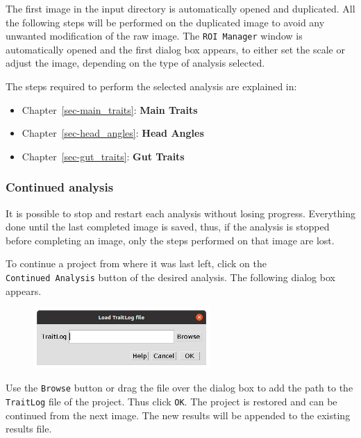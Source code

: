 \documentclass[
  letterpaper,
]{scrbook}
\providecommand{\tightlist}{%
  \setlength{\itemsep}{0pt}\setlength{\parskip}{0pt}}\usepackage{longtable,booktabs,array}
\begin{document}
The first image in the input directory is automatically opened and
duplicated. All the following steps will be performed on the duplicated
image to avoid any unwanted modification of the raw image. The
\texttt{ROI\ Manager} window is automatically opened and the first
dialog box appears, to either set the scale or adjust the image,
depending on the type of analysis selected.

The steps required to perform the selected analysis are explained in:

\begin{itemize}
\tightlist
\item
  Chapter~\ref{sec-main_traits}: \textbf{Main Traits}
\item
  Chapter~\ref{sec-head_angles}: \textbf{Head Angles}
\item
  Chapter~\ref{sec-gut_traits}: \textbf{Gut Traits}
\end{itemize}

\hypertarget{continued-analysis}{%
\subsubsection*{Continued analysis}\label{continued-analysis}}

It is possible to stop and restart each analysis without losing
progress. Everything done until the last completed image is saved, thus,
if the analysis is stopped before completing an image, only the steps
performed on that image are lost.

To continue a project from where it was last left, click on the
\texttt{Continued\ Analysis} button of the desired analysis. The
following dialog box appears.

\begin{figure}

{\centering \includegraphics[width=0.6\textwidth,height=\textheight]{./images/screenshots/load_traitlog.png}

}

\end{figure}

Use the \texttt{Browse} button or drag the file over the dialog box to
add the path to the \texttt{TraitLog} file of the project. Thus click
\texttt{OK}. The project is restored and can be continued from the next
image. The new results will be appended to the existing results file.
\end{document}
